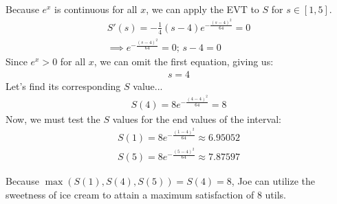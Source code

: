 Because $e^x$ is continuous for all $x$, we can apply the EVT to $S$ for $s\in[1, 5]$.
\begin{align*}
	S'(s)=-\frac{1}{4}(s-4)e^{-\frac{(s-4)^2}{64}}=0\\
	\implies e^{-\frac{(s-4)^2}{64}}=0\text{; }s-4=0
\end{align*}
Since $e^x > 0$ for all $x$, we can omit the first equation, giving us:
\begin{align*}
	s = 4
\end{align*}
Let's find its corresponding $S$ value...
\begin{align*}
	S(4) = 8e^{-\frac{(4-4)^2}{64}} = 8
\end{align*}
Now, we must test the $S$ values for the end values of the interval:
\begin{align*}
	S(1) = 8e^{-\frac{(1-4)^2}{64}} \approx 6.95052\\
	S(5) = 8e^{-\frac{(5-4)^2}{64}} \approx 7.87597
\end{align*}

Because $\max(S(1), S(4), S(5)) = S(4) = 8$, Joe can utilize the sweetness of ice cream to attain a maximum satisfaction of $8$ utils.